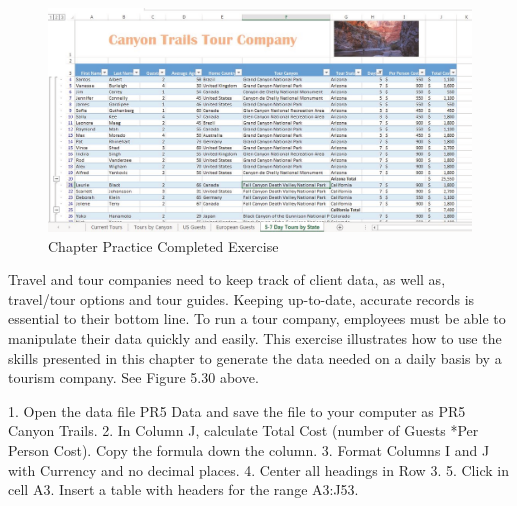 \begin{figure}[H]
	\centering
	\includegraphics[width=\maxwidth{.95\linewidth}]{gfx/ch05_fig30}
	\caption{Chapter Practice Completed Exercise}
	\label{05:fig30}
\end{figure}






Travel and tour companies need to keep track of client data, as well as, travel/tour options and tour
guides. Keeping up-to-date, accurate records is essential to their bottom line. To run a tour company,
employees must be able to manipulate their data quickly and easily. This exercise illustrates how to use
the skills presented in this chapter to generate the data needed on a daily basis by a tourism company.
See Figure 5.30 above.

1. Open the data file PR5 Data and save the file to your computer as PR5 Canyon Trails.
2. In Column J, calculate Total Cost (number of Guests *Per Person Cost). Copy the formula down
the column.
3. Format Columns I and J with Currency and no decimal places.
4. Center all headings in Row 3.
5. Click in cell A3. Insert a table with headers for the range A3:J53.


